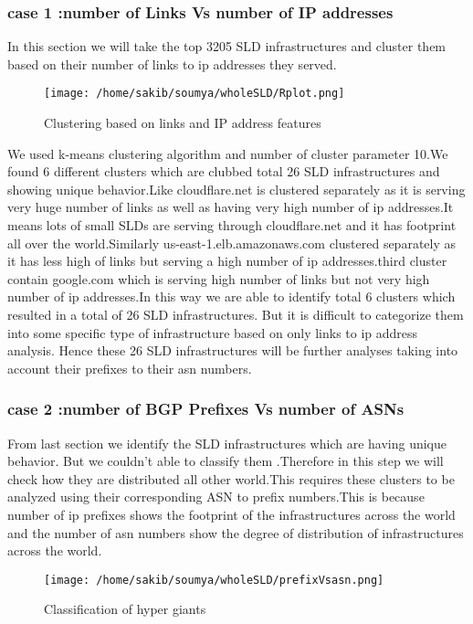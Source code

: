 \subsubsection{case 1 :number of Links Vs number of IP addresses}
In this section we will take the top 3205 SLD infrastructures and cluster them based on their number of links to ip addresses they served.

\begin{figure}[h]
\texttt{[image: /home/sakib/soumya/wholeSLD/Rplot.png]}
\centering
\caption{Clustering based on links and IP address features}
\end{figure}

We used k-means clustering algorithm and number of cluster parameter 10.We found 6 different clusters which are clubbed total 26 SLD infrastructures and showing unique behavior.Like cloudflare.net is clustered separately as it is serving very huge number of links as well as having very high number of ip addresses.It means lots of small SLDs are serving through cloudflare.net and it has footprint all over the world.Similarly us-east-1.elb.amazonaws.com clustered separately as it has less high of links but serving a high number of ip addresses.third cluster contain google.com which is serving high number of links but not very high number of ip addresses.In this way we are able to identify total 6 clusters which resulted in a total of 26 SLD infrastructures. But it is difficult to categorize them into some specific type of infrastructure based on only  links to ip address analysis. Hence these 26 SLD infrastructures will be further analyses taking into account their prefixes to their asn numbers.

\subsubsection{case 2 :number of BGP Prefixes Vs number of ASNs}
From last section we identify the SLD infrastructures which are having unique behavior. But we couldn't able to classify them .Therefore in this step we will check how they are distributed all other world.This requires these clusters to be analyzed using their corresponding ASN to prefix numbers.This is because number of ip prefixes shows the footprint of the infrastructures across the world and the number of asn numbers show the degree of distribution of infrastructures across the world.
\begin{figure}[h]
\texttt{[image: /home/sakib/soumya/wholeSLD/prefixVsasn.png]}
\centering
\caption{Classification of hyper giants}
\end{figure}

